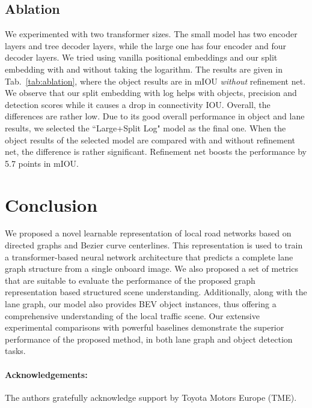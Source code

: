\documentclass[10pt,twocolumn,letterpaper]{article}
\begin{document}
\subsection{Ablation}

We experimented with two transformer sizes. The small model has two encoder layers and tree decoder layers, while the large one has four encoder and four decoder layers. We tried using vanilla positional embeddings and our split embedding with and without taking the logarithm. The results are given in Tab.~\ref{tab:ablation}, where the object results are in mIOU \emph{without} refinement net. We observe that our split embedding with log helps with objects, precision and detection scores while it causes a drop in connectivity IOU. Overall, the differences are rather low. Due to its good overall performance in object and lane results, we selected the ``Large+Split Log" model as the final one. When the object results of the selected model are compared with and without refinement net, the difference is rather significant. Refinement net boosts the performance by 5.7 points in mIOU. 







\section{Conclusion}
We proposed a novel learnable representation of local road networks based on directed graphs and Bezier curve centerlines. This representation is used to train a transformer-based neural network architecture that predicts a complete lane graph structure from a single onboard image. We also proposed a set of metrics that are suitable to evaluate the performance of the proposed graph representation based structured scene understanding. Additionally, along with the lane graph, our model also provides BEV object instances, thus offering a comprehensive understanding of the local traffic scene. Our extensive experimental comparisons with powerful baselines demonstrate the superior performance of the proposed method,  in both lane graph and object detection tasks. 



\paragraph{Acknowledgements:} The authors gratefully acknowledge support by Toyota Motors Europe (TME).
\end{document}
